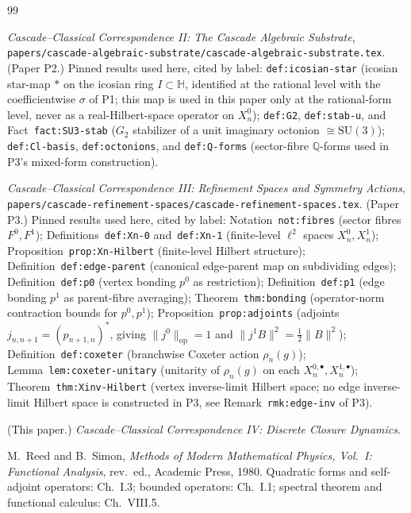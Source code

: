 \documentclass[11pt, a4paper]{amsart}
\theoremstyle{definition}
\newcommand{\Q}{\mathbb{Q}}
\newcommand{\HH}{\mathbb{H}}
\newcommand{\op}{\operatorname{op}}
\begin{document}
\begin{thebibliography}{99}

\emph{Cascade--Classical Correspondence II: The Cascade Algebraic
Substrate},
\texttt{papers/cascade-algebraic-substrate/cascade-algebraic-substrate.tex}.
(Paper P2.) Pinned results used here, cited by label:
\texttt{def:icosian-star} (icosian star-map $\ast$ on the icosian
ring $I \subset \HH$, identified at the rational level with the
coefficientwise $\sigma$ of P1; this map is used in this paper
only at the rational-form level, never as a real-Hilbert-space
operator on $X_n^0$);
\texttt{def:G2}, \texttt{def:stab-u}, and
Fact~\texttt{fact:SU3-stab} ($G_2$ stabilizer of a unit imaginary
octonion $\cong \mathrm{SU}(3)$);
\texttt{def:Cl-basis}, \texttt{def:octonions}, and
\texttt{def:Q-forms} (sector-fibre $\Q$-forms used in P3's
mixed-form construction).

\emph{Cascade--Classical Correspondence III: Refinement Spaces
and Symmetry Actions},
\texttt{papers/cascade-refinement-spaces/cascade-refinement-spaces.tex}.
(Paper P3.) Pinned results used here, cited by label:
Notation~\texttt{not:fibres} (sector fibres $F^0, F^1$);
Definitions~\texttt{def:Xn-0} and~\texttt{def:Xn-1} (finite-level
$\ell^2$ spaces $X_n^0, X_n^1$);
Proposition~\texttt{prop:Xn-Hilbert} (finite-level Hilbert
structure);
Definition~\texttt{def:edge-parent} (canonical edge-parent map
on subdividing edges);
Definition~\texttt{def:p0} (vertex bonding $p^0$ as restriction);
Definition~\texttt{def:p1} (edge bonding $p^1$ as parent-fibre
averaging);
Theorem~\texttt{thm:bonding} (operator-norm contraction bounds
for $p^0, p^1$);
Proposition~\texttt{prop:adjoints} (adjoints
$j_{n, n+1} = (p_{n+1, n})^*$, giving
$\|j^0\|_{\op} = 1$ and $\|j^1 B\|^2 = \tfrac{1}{2}\|B\|^2$);
Definition~\texttt{def:coxeter} (branchwise Coxeter action
$\rho_n(g)$);
Lemma~\texttt{lem:coxeter-unitary} (unitarity of $\rho_n(g)$ on
each $X_n^{0, \bullet}, X_n^{1, \bullet}$);
Theorem~\texttt{thm:Xinv-Hilbert} (vertex inverse-limit Hilbert
space; no edge inverse-limit Hilbert space is constructed in
P3, see Remark~\texttt{rmk:edge-inv} of P3).

(This paper.) \emph{Cascade--Classical Correspondence IV: Discrete
Closure Dynamics}.

M.~Reed and B.~Simon, \emph{Methods of Modern Mathematical
Physics, Vol.~I: Functional Analysis}, rev.\ ed., Academic Press,
1980. Quadratic forms and self-adjoint operators: Ch.~I.3;
bounded operators: Ch.~I.1; spectral theorem and functional
calculus: Ch.~VIII.5.


\end{thebibliography}
\end{document}
